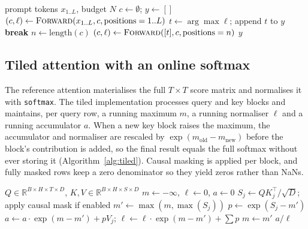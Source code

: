 \documentclass[conference]{IEEEtran}
\begin{document}
\begin{algorithm}[t]
\caption{KV-cached greedy decoding}
\label{alg:cached}
\begin{algorithmic}[1]
\Require prompt tokens $x_{1..L}$, budget $N$
\State $c \gets \emptyset$; $y \gets []$
\State $(c, \ell) \gets \textsc{Forward}(x_{1..L}, c, \text{positions}=1..L)$
  \State $t \gets \arg\max \ell$; append $t$ to $y$
   \State \textbf{break} \EndIf
  \State $n \gets \text{length}(c)$
  \State $(c, \ell) \gets \textsc{Forward}([t], c, \text{positions}=n)$
\EndFor
\State \Return $y$
\end{algorithmic}
\end{algorithm}

\subsection{Tiled attention with an online softmax}
The reference attention materialises the full $T\times T$ score matrix and normalises it with
\texttt{softmax}. The tiled implementation processes query and key blocks and maintains, per query
row, a running maximum $m$, a running normaliser $\ell$ and a running accumulator $a$. When a new
key block raises the maximum, the accumulator and normaliser are rescaled by
$\exp(m_{\text{old}}-m_{\text{new}})$ before the block's contribution is added, so the final result
equals the full softmax without ever storing it (Algorithm~\ref{alg:tiled}). Causal masking is
applied per block, and fully masked rows keep a zero denominator so they yield zeros rather than
NaNs.

\begin{algorithm}[t]
\caption{Tiled attention with online softmax (one query block)}
\label{alg:tiled}
\begin{algorithmic}[1]
\Require $Q \in \mathbb{R}^{B\times H\times T\times D}$, $K,V \in \mathbb{R}^{B\times H\times S\times D}$
\State $m \gets -\infty$, $\ell \gets 0$, $a \gets 0$ 
  \State $S_j \gets QK_j^{\top}/\sqrt{D}$; apply causal mask if enabled
  \State $m' \gets \max(m, \max(S_j))$
  \State $p \gets \exp(S_j - m')$
  \State $a \gets a \cdot \exp(m - m') + pV_j$; $\ell \gets \ell \cdot \exp(m - m') + \sum p$
  \State $m \gets m'$
\EndFor
\State \Return $a / \ell$
\end{algorithmic}
\end{algorithm}
\end{document}
